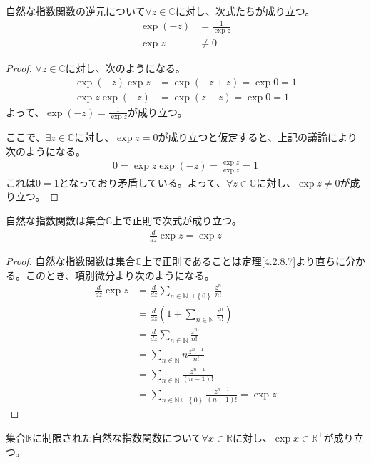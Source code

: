 \documentclass[dvipdfmx]{jsarticle}
\begin{document}
\begin{thm}\label{4.3.1.5}
自然な指数関数の逆元について$\forall z \in \mathbb{C}$に対し、次式たちが成り立つ。
\begin{align*}
\exp( - z) &= \frac{1}{\exp z}\\
\exp z &\neq 0
\end{align*}
\end{thm}
\begin{proof} $\forall z \in \mathbb{C}$に対し、次のようになる。
\begin{align*}
\exp( - z)\exp z &= \exp( - z + z) = \exp 0 = 1\\
\exp z\exp( - z) &= \exp(z - z) = \exp 0 = 1
\end{align*}
よって、$\exp( - z) = \frac{1}{\exp z}$が成り立つ。\par
ここで、$\exists z \in \mathbb{C}$に対し、$\exp z = 0$が成り立つと仮定すると、上記の議論により次のようになる。
\begin{align*}
0 = \exp z\exp( - z) = \frac{\exp z}{\exp z} = 1
\end{align*}
これは$0 = 1$となっており矛盾している。よって、$\forall z \in \mathbb{C}$に対し、$\exp z \neq 0$が成り立つ。
\end{proof}
\begin{thm}\label{4.3.1.6} 自然な指数関数は集合$\mathbb{C}$上で正則で次式が成り立つ。
\begin{align*}
\frac{d}{dz}\exp z = \exp z
\end{align*}
\end{thm}
\begin{proof} 自然な指数関数は集合$\mathbb{C}$上で正則であることは定理\ref{4.2.8.7}より直ちに分かる。このとき、項別微分より次のようになる。
\begin{align*}
\frac{d}{dz}\exp z &= \frac{d}{dz}\sum_{n \in \mathbb{N} \cup \left\{ 0 \right\}} \frac{z^{n}}{n!}\\
&= \frac{d}{dz}\left( 1 + \sum_{n \in \mathbb{N}} \frac{z^{n}}{n!} \right)\\
&= \frac{d}{dz}\sum_{n \in \mathbb{N}} \frac{z^{n}}{n!}\\
&= \sum_{n \in \mathbb{N}} {n\frac{z^{n - 1}}{n!}}\\
&= \sum_{n \in \mathbb{N}} \frac{z^{n - 1}}{(n - 1)!}\\
&= \sum_{n \in \mathbb{N} \cup \left\{ 0 \right\}} \frac{z^{n - 1}}{(n - 1)!} = \exp z
\end{align*}
\end{proof}
\begin{thm}\label{4.3.1.7}
集合$\mathbb{R}$に制限された自然な指数関数について$\forall x \in \mathbb{R}$に対し、$\exp x \in \mathbb{R}^{+}$が成り立つ。
\end{thm}
\end{document}
